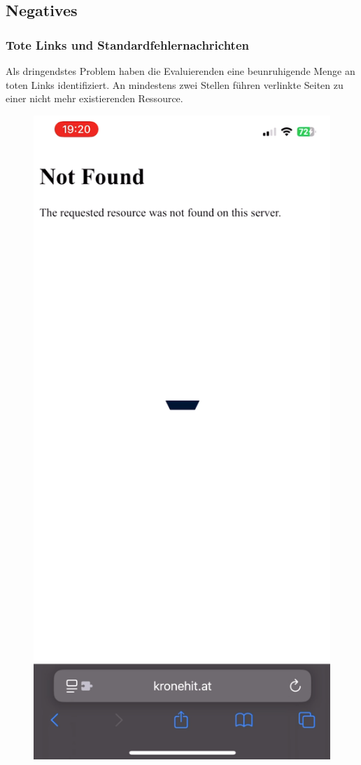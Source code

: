 \documentclass{article}
\begin{document}
	\subsection{Negatives}
	\subsubsection{Tote Links und Standardfehlernachrichten}
	Als dringendstes Problem haben die Evaluierenden eine beunruhigende Menge an toten Links identifiziert. An mindestens zwei Stellen führen verlinkte Seiten zu einer nicht mehr existierenden Ressource. \\
	\begin{figure}
		\begin{center}
			\includegraphics[scale=0.296]{Bilder/notfound1.png}

\end{center}
\end{figure}
\end{document}
